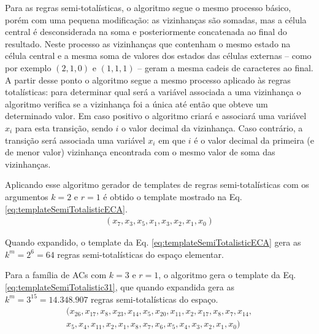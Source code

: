 Para as regras semi-totalísticas, o algoritmo segue o mesmo processo básico, porém com uma pequena modificação: as vizinhanças são somadas, mas a célula central é desconsiderada na soma e posteriormente concatenada ao final do resultado. Neste processo as vizinhanças que contenham o mesmo estado na célula central e a mesma soma de valores dos estados das células externas -- como por exemplo $(2,1,0)$ e $(1,1,1)$ -- geram a mesma cadeis de caracteres ao final. A partir desse ponto o algoritmo segue a mesmo processo aplicado às regras totalísticas: para determinar qual será a variável associada a uma vizinhança o algoritmo verifica se a vizinhança foi a única até então que obteve um determinado valor. Em caso positivo o algoritmo criará e associará uma variável $x_i$ para esta transição, sendo $i$ o valor decimal da vizinhança. Caso contrário, a transição será associada uma variável $x_i$ em que $i$ é o valor decimal da primeira (e de menor valor) vizinhança encontrada com o mesmo valor de soma das vizinhanças.

Aplicando esse algoritmo gerador de templates de regras semi-totalísticas com os argumentos $k=2$ e $r=1$ é obtido o template mostrado na Eq. \eqref{eq:templateSemiTotalisticECA}.
\begin{equation}
\begin{split}
(x_7,x_3,x_5,x_1,x_3,x_2,x_1,x_0)
\label{eq:templateSemiTotalisticECA}
\end{split}
\end{equation}

Quando expandido, o template da Eq. \eqref{eq:templateSemiTotalisticECA} gera as $k^m = 2^6 = 64$ regras semi-totalísticas do espaço elementar.

Para a família de ACs com $k=3$ e $r=1$, o algoritmo gera o template da Eq. \eqref{eq:templateSemiTotalistic31}, que quando expandida gera as $k^m = 3^{15} = 14.348.907$ regras semi-totalísticas do espaço.
\begin{equation}
\begin{split}
(x_{26},x_{17},x_8,x_{23},x_{14},x_5,x_{20},x_{11},x_2,x_{17},x_8,x_7,x_{14},\\
x_5,x_4,x_{11},x_2,x_1,x_8,x_7,x_6,x_5,x_4,x_3,x_2,x_1,x_0)
\label{eq:templateSemiTotalistic31}
\end{split}
\end{equation}